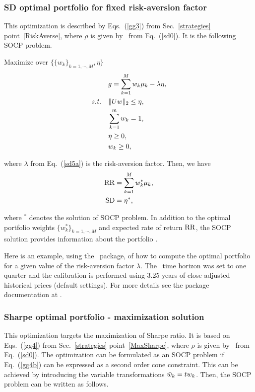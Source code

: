 \BackToContents


\subsubsection{SD optimal portfolio for fixed risk-aversion factor}
This optimization is described by Eqs.~(\ref{gg3}) from Sec.~\ref{strategies} point~\ref{RiskAverse},
where $\rho$ is given by \SD\ from Eq.\ (\ref{sd0}).
It is the following SOCP problem.

\bigskip
\noindent Maximize over $\{ \{w_k\}_{k=1,\cdots,M}, \eta \}$
\begin{subequations}\label{sd5}
\begin{align}
    & g = \sum_{k=1}^M w_k \mu_k -\lambda \eta, \label{sd5a} \\
    \st & \| U w\|_2 \leq \eta, \label{sd5b} \\
        & \sum_{k=1}^m w_k = 1, \label{sd5c} \\
        & \eta \geq 0, \label{sd5e} \\
        & w_k \geq 0, \label{sd5d}
\end{align}
\end{subequations}

\noindent where $\lambda$ from Eq.~(\ref{sd5a}) is the risk-aversion factor.
Then, we have
\begin{subequations}\label{sd6}
\begin{align}
    \RR &= \sum_{k=1}^M w_k^* \mu_k, \label{sd6a} \\
    \SD &= \eta^*, \label{sd6b}
\end{align}
\end{subequations}

\noindent where $^*$ denotes the solution of SOCP problem.
In addition to the optimal portfolio weights $\{w_k^*\}_{k=1,\cdots,M}$ and expected rate of return ${\rm RR}$, the
SOCP solution provides information about the portfolio \SD.

\bigskip
\noindent Here is an example, using the \azapy\ package, of how to compute the optimal portfolio
for a given value of the risk-aversion factor $\lambda$.
The \SD\ time horizon was set to one quarter and the calibration is performed using 3.25 years of
close-adjusted historical prices (default settings).
For more details see the package documentation at \azapydoc.



\BackToContents


\subsubsection{Sharpe optimal portfolio - maximization solution}
This optimization targets the maximization of Sharpe ratio. It is based on
Eqs.~(\ref{gg4}) from Sec.~\ref{strategies} point~\ref{MaxSharpe},
where $\rho$ is given by \SD\ from Eq.~(\ref{sd0}).
The optimization can be formulated as an SOCP problem
if Eq.~(\ref{gg4b}) can be expressed as a second order cone constraint.  This can be achieved by
introducing the variable transformations ${\bar w}_k = t w_k$. Then, the SOCP
problem can be written as follows.

